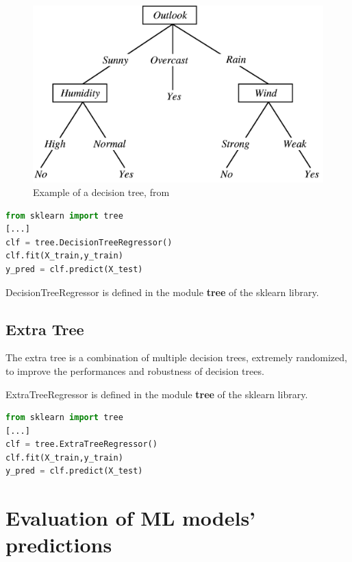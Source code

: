 \begin{figure}
    \centering
    \includegraphics[scale=0.3]{res/ML/decisiontree.png}
    \caption{Example of a decision tree, from \cite{decisionTree}}
\end{figure}

\begin{lstlisting}[language=Python, caption=Decision Tree implementation]
from sklearn import tree
[...]
clf = tree.DecisionTreeRegressor()
clf.fit(X_train,y_train)
y_pred = clf.predict(X_test)
\end{lstlisting}

DecisionTreeRegressor is defined in the module \textbf{tree} of the sklearn library.

\pagebreak

\subsection{Extra Tree}
The extra tree is a combination of multiple decision trees, extremely randomized, to improve the performances and robustness of decision trees.

ExtraTreeRegressor is defined in the module \textbf{tree} of the sklearn library.

\begin{lstlisting}[language=Python, caption=Extra Tree implementation]
from sklearn import tree
[...]
clf = tree.ExtraTreeRegressor()
clf.fit(X_train,y_train)
y_pred = clf.predict(X_test)
\end{lstlisting}




\section{Evaluation of ML models' predictions}

